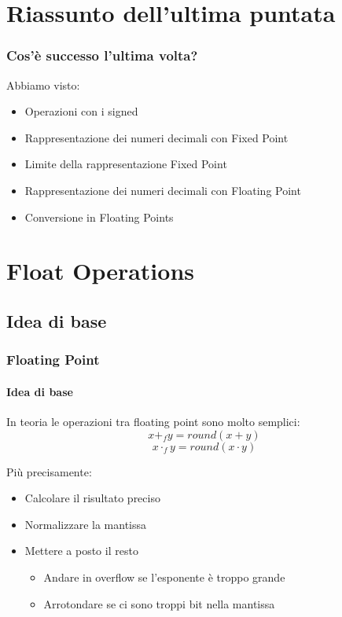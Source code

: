 \documentclass{beamer}
\begin{document}
	\section{Riassunto dell'ultima puntata}  
  \begin{frame}
    \frametitle{Cos'è successo l'ultima volta?}
		Abbiamo visto:    
    \begin{itemize}
    		\item Operazioni con i signed
    		\item Rappresentazione dei numeri decimali con Fixed Point
    		\item Limite della rappresentazione Fixed Point
    		\item Rappresentazione dei numeri decimali con Floating Point
    		\item Conversione in Floating Points
    \end{itemize}
  \end{frame}
	
	\section{Float Operations}
	\subsection{Idea di base}
  \begin{frame}
    \frametitle{Floating Point}
    \framesubtitle{Idea di base}
    In teoria le operazioni tra floating point sono molto semplici:
    $$x +_{f} y = round(x + y)$$
    $$x \cdot_{f} y = round(x \cdot y)$$
    
		\vspace{2em}    
    
    Più precisamente:
    \begin{itemize}
    		\item Calcolare il risultato preciso
    		\item Normalizzare la mantissa
    		\item Mettere a posto il resto
    		\begin{itemize}
    			\item Andare in overflow se l'esponente è troppo grande
    			\item Arrotondare se ci sono troppi bit nella mantissa
    		\end{itemize}
    \end{itemize}
  \end{frame}
  
\end{document}
